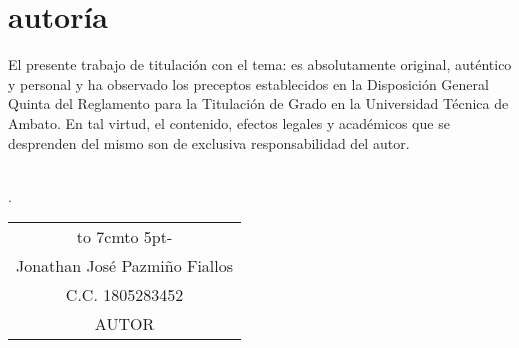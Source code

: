 \newpage
\chapter*{autoría}
El presente trabajo de titulaci\'on con el tema: {\MakeUppercase\tema} es absolutamente original, auténtico y personal y ha observado
los preceptos establecidos en la Disposición General Quinta del Reglamento para la
Titulación de Grado en la Universidad Técnica de Ambato. En tal virtud, el contenido,
efectos legales y académicos que se desprenden del mismo son de exclusiva
responsabilidad del autor.
\\
\\
\begin{flushright}
	\lugarFechaPrelims.
\end{flushright}

\vspace*{5cm}
\begin{center}
	\begin{tabular}{c}
		\hbox to 7cm{\leaders\hbox to 5pt{\hss - \hss}\hfil} \\
		Jonathan José Pazmiño Fiallos                        \\
		C.C. 1805283452                                      \\
		AUTOR
	\end{tabular}
\end{center}
